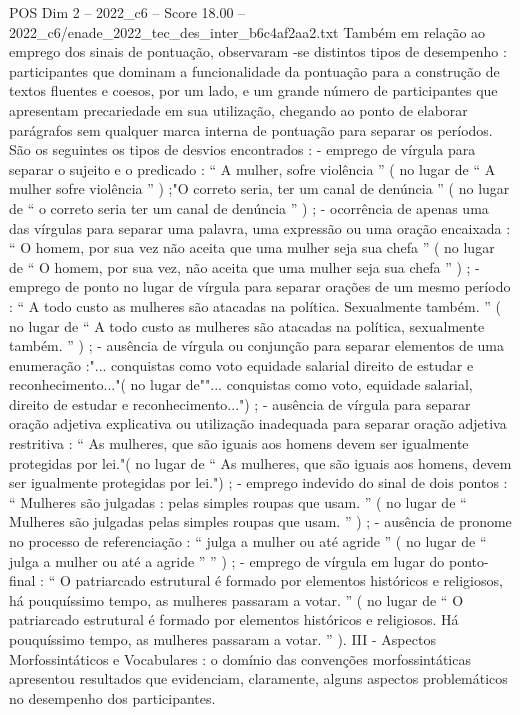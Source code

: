 \begin{textsample}{POS Dim 2 – 2022\_c6 – Score 18.00 – 2022\_c6/enade\_2022\_tec\_des\_inter\_b6c4af2aa2.txt}
Também em relação ao emprego dos sinais de pontuação, observaram -se distintos tipos de desempenho : participantes que dominam a funcionalidade da pontuação para a construção de textos fluentes e coesos, por um lado, e um grande número de participantes que apresentam precariedade em sua utilização, chegando ao ponto de elaborar parágrafos sem qualquer marca interna de pontuação para separar os períodos.
São os seguintes os tipos de desvios encontrados : - emprego de vírgula para separar o sujeito e o predicado : “ A mulher, sofre violência ” ( no lugar de “ A mulher sofre violência ” ) ;"O correto seria, ter um canal de denúncia ” ( no lugar de “ o correto seria ter um canal de denúncia ” ) ; - ocorrência de apenas uma das vírgulas para separar uma palavra, uma expressão ou uma oração encaixada : “ O homem, por sua vez não aceita que uma mulher seja sua chefa ” ( no lugar de “ O homem, por sua vez, não aceita que uma mulher seja sua chefa ” ) ; - emprego de ponto no lugar de vírgula para separar orações de um mesmo período : “ A todo custo as mulheres são atacadas na política.
Sexualmente também. ” ( no lugar de “ A todo custo as mulheres são atacadas na política, sexualmente também. ” ) ; - ausência de vírgula ou conjunção para separar elementos de uma enumeração :"... conquistas como voto equidade salarial direito de estudar e reconhecimento..."( no lugar de""... conquistas como voto, equidade salarial, direito de estudar e reconhecimento...") ; - ausência de vírgula para separar oração adjetiva explicativa ou utilização inadequada para separar oração adjetiva restritiva : “ As mulheres, que são iguais aos homens devem ser igualmente protegidas por lei."( no lugar de “ As mulheres, que são iguais aos homens, devem ser igualmente protegidas por lei.") ; - emprego indevido do sinal de dois pontos : “ Mulheres são julgadas : pelas simples roupas que usam. ” ( no lugar de “ Mulheres são julgadas pelas simples roupas que usam. ” ) ; - ausência de pronome no processo de referenciação : “ julga a mulher ou até agride ” ( no lugar de “ julga a mulher ou até a agride ” ” ) ; - emprego de vírgula em lugar do ponto-final : “ O patriarcado estrutural é formado por elementos históricos e religiosos, há pouquíssimo tempo, as mulheres passaram a votar. ” ( no lugar de “ O patriarcado estrutural é formado por elementos históricos e religiosos.
Há pouquíssimo tempo, as mulheres passaram a votar. ” ).
III - Aspectos Morfossintáticos e Vocabulares : o domínio das convenções morfossintáticas apresentou resultados que evidenciam, claramente, alguns aspectos problemáticos no desempenho dos participantes.

\end{textsample}
